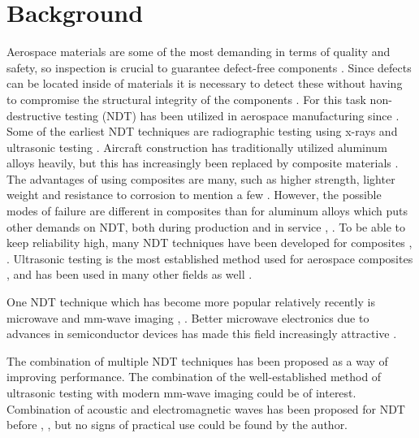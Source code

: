 \documentclass[11pt,twoside]{eitExjobb}
\begin{document}
	\section{Background}
	Aerospace materials are some of the most demanding in terms of quality and safety, so inspection is crucial to guarantee defect-free components \addref. Since defects can be located inside of materials it is necessary to detect these without having to compromise the structural integrity of the components \addref. For this task non-destructive testing (NDT) has been utilized in aerospace manufacturing since . Some of the earliest NDT techniques are radiographic testing using x-rays and ultrasonic testing \addref {}. Aircraft construction has traditionally utilized aluminum alloys heavily, but this has increasingly been replaced by composite materials \cite{Saha2016}. The advantages of using composites are many, such as higher strength, lighter weight and resistance to corrosion to mention a few \cite{Saha2016}. However, the possible modes of failure are different in composites than for aluminum alloys which puts other demands on NDT, both during production and in service \cite{Saha2016}, \cite{Katunin2015}. To be able to keep reliability high, many NDT techniques have been developed for composites \cite{Katunin2015}, \cite{Gholizadeh2016}. Ultrasonic testing is the most established method used for aerospace composites \cite{Garnier2011}, and has been used in many other fields as well \cite{Schmerr2016}.
	
	One NDT technique which has become more popular relatively recently is microwave and mm-wave imaging \cite{Kharkovsky2007}, \cite{Dobmann2012}. Better microwave electronics due to advances in semiconductor devices has made this field increasingly attractive \cite{Dobmann2012}. 
	
	The combination of multiple NDT techniques has been proposed as a way of improving performance.  The combination of the well-established method of ultrasonic testing with modern mm-wave imaging could be of interest. Combination of acoustic and electromagnetic waves has been proposed for NDT before \cite{Buerkle2009}, \cite{Merkel2006}, but no signs of practical use could be found by the author.
	
\end{document}
